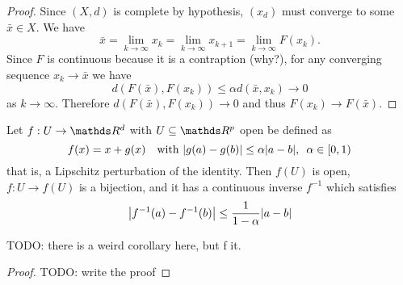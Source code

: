 \documentclass[12pt]{extarticle}
\begin{document}
\begin{proof}
    Since $(X, d)$ is complete by hypothesis, $(x_d)$ must converge to some $\bar x \in X$.
    We have
    \begin{equation}
        \bar x = \lim_{k \to \infty} x_k = \lim_{k \to \infty} x_{k + 1} = \lim_{k \to \infty} F(x_k).
    \end{equation}
    Since $F$ is continuous because it is a contraption (why?), for any converging sequence $x_k \to \bar x$ we have
    \begin{equation}
        d(F(\bar x), F(x_k)) \leq \alpha d(\bar x, x_k) \to 0
    \end{equation}
    as $k \to \infty$.
    Therefore $d(F(\bar x), F(x_k)) \to 0$ and thus $F(x_k) \to F(\bar x)$.
\end{proof}

\begin{theorem}{}{}
    Let $f: U \to \R^d$ with $U \subseteq \R^p$ open be defined as
    \begin{equation}
        f(x) = x + g(x) \quad \text{with } \abs{g(a) - g(b)} \leq \alpha \abs{a - b}, \enspace \alpha \in [0,1)
    \end{equation}
    that is, a Lipschitz perturbation of the identity.
    Then $f(U)$ is open, $f: U \to f(U)$ is a bijection, and it has a continuous inverse $f^{-1}$
    which satisfies
    \begin{equation}
        \abs{f^{-1}(a)- f^{-1}(b)} \leq \frac{1}{1-\alpha} \abs{a-b}
    \end{equation}
\end{theorem}

TODO: there is a weird corollary here, but f it.

\begin{proof}
    TODO: write the proof
\end{proof}
\end{document}
